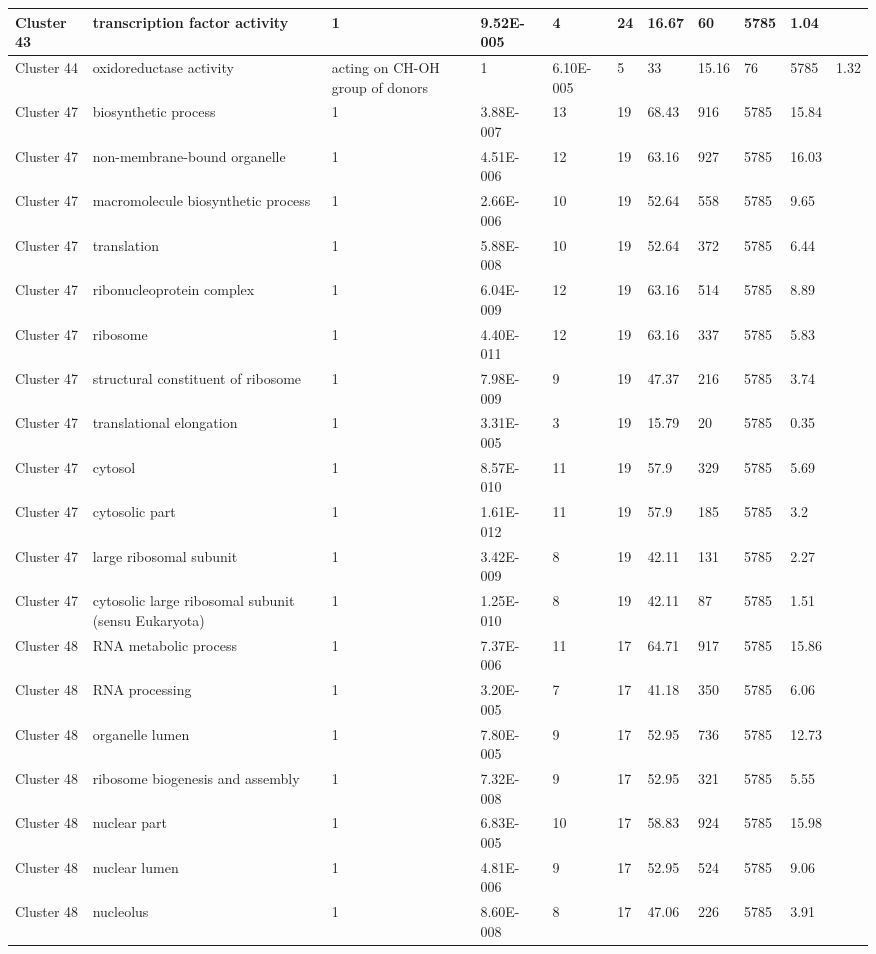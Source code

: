 \begin{tabular}{|l|l|l|l|l|l|l|l|l|l|l|}
\hline
Cluster 43&transcription factor activity&1&9.52E-005&4&24&16.67&60&5785&1.04&\\
\hline
Cluster 44&oxidoreductase activity& acting on CH-OH group of donors&1&6.10E-005&5&33&15.16&76&5785&1.32\\
\hline
Cluster 47&biosynthetic process&1&3.88E-007&13&19&68.43&916&5785&15.84&\\
\hline
Cluster 47&non-membrane-bound organelle&1&4.51E-006&12&19&63.16&927&5785&16.03&\\
\hline
Cluster 47&macromolecule biosynthetic process&1&2.66E-006&10&19&52.64&558&5785&9.65&\\
\hline
Cluster 47&translation&1&5.88E-008&10&19&52.64&372&5785&6.44&\\
\hline
Cluster 47&ribonucleoprotein complex&1&6.04E-009&12&19&63.16&514&5785&8.89&\\
\hline
Cluster 47&ribosome&1&4.40E-011&12&19&63.16&337&5785&5.83&\\
\hline
Cluster 47&structural constituent of ribosome&1&7.98E-009&9&19&47.37&216&5785&3.74&\\
\hline
Cluster 47&translational elongation&1&3.31E-005&3&19&15.79&20&5785&0.35&\\
\hline
Cluster 47&cytosol&1&8.57E-010&11&19&57.9&329&5785&5.69&\\
\hline
Cluster 47&cytosolic part&1&1.61E-012&11&19&57.9&185&5785&3.2&\\
\hline
Cluster 47&large ribosomal subunit&1&3.42E-009&8&19&42.11&131&5785&2.27&\\
\hline
Cluster 47&cytosolic large ribosomal subunit (sensu Eukaryota)&1&1.25E-010&8&19&42.11&87&5785&1.51&\\
\hline
Cluster 48&RNA metabolic process&1&7.37E-006&11&17&64.71&917&5785&15.86&\\
\hline
Cluster 48&RNA processing&1&3.20E-005&7&17&41.18&350&5785&6.06&\\
\hline
Cluster 48&organelle lumen&1&7.80E-005&9&17&52.95&736&5785&12.73&\\
\hline
Cluster 48&ribosome biogenesis and assembly&1&7.32E-008&9&17&52.95&321&5785&5.55&\\
\hline
Cluster 48&nuclear part&1&6.83E-005&10&17&58.83&924&5785&15.98&\\
\hline
Cluster 48&nuclear lumen&1&4.81E-006&9&17&52.95&524&5785&9.06&\\
\hline
Cluster 48&nucleolus&1&8.60E-008&8&17&47.06&226&5785&3.91&\\
\hline
\end{tabular}
